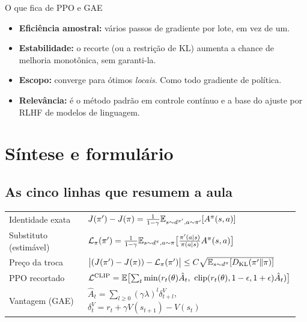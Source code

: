 \documentclass[11pt]{article}
\newcommand{\thv}{\theta}
\newcommand{\polnovo}{\pol'}
\newcommand{\Ahat}{\hat{A}}
\newcommand{\Advpi}{A^{\pol}}
\newcommand{\Dkl}{D_{\mathrm{KL}}}
\newcommand{\dpi}{d^{\pol}}
\newcommand{\Lsub}[1]{\mathcal{L}_{#1}}
\DeclareMathOperator{\clip}{clip}
\newcommand{\razao}{r_t(\thv)}
\newcommand{\Lclip}{\mathcal{L}^{\mathrm{CLIP}}}
\begin{document}
\begin{defbox}{O que fica de PPO e GAE}
\begin{itemize}
  \item \textbf{Eficiência amostral:} vários passos de gradiente por lote, em vez de um.
  \item \textbf{Estabilidade:} o recorte (ou a restrição de KL) aumenta a chance de
    melhoria monotônica, sem garanti-la.
  \item \textbf{Escopo:} converge para ótimos \emph{locais}. Como todo gradiente de
    política.
  \item \textbf{Relevância:} é o método padrão em controle contínuo e a base do
    ajuste por RLHF de modelos de linguagem.
\end{itemize}
\end{defbox}

\section{Síntese e formulário}

\subsection{As cinco linhas que resumem a aula}

\begin{center}\small
\begin{tabular}{@{}>{\raggedright\arraybackslash}p{0.30\linewidth}
                 >{\raggedright\arraybackslash}p{0.66\linewidth}@{}}
\toprule
Identidade exata &
  $J(\polnovo)-J(\pol) = \frac{1}{1-\gamma}\E_{s\sim d^{\polnovo}, a\sim\polnovo}[\Advpi(s,a)]$ \\[0.4em]
Substituto (estimável) &
  $\Lsub{\pol}(\polnovo) = \frac{1}{1-\gamma}\E_{s\sim\dpi,a\sim\pol}\bigl[\frac{\polnovo(a\mid s)}{\pol(a\mid s)}\Advpi(s,a)\bigr]$ \\[0.4em]
Preço da troca &
  $\bigl|(J(\polnovo)-J(\pol)) - \Lsub{\pol}(\polnovo)\bigr| \le C\sqrt{\E_{s\sim\dpi}[\Dkl(\polnovo\|\pol)]}$ \\[0.4em]
PPO recortado &
  $\Lclip = \E\bigl[\sum_t \min(\razao\Ahat_t,\ \clip(\razao,1-\epsilon,1+\epsilon)\Ahat_t)\bigr]$ \\[0.4em]
Vantagem (GAE) &
  $\Ahat_t = \sum_{l\ge0}(\gamma\lambda)^l\delta^V_{t+l}$, \quad
  $\delta^V_t = r_t + \gamma V(s_{t+1}) - V(s_t)$ \\
\bottomrule
\end{tabular}
\end{center}
\end{document}
